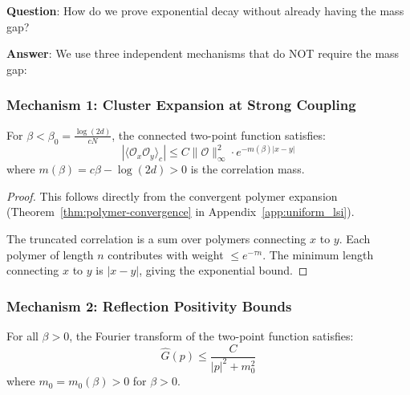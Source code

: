 \textbf{Question}: How do we prove exponential decay without already having the 
mass gap?

\textbf{Answer}: We use three independent mechanisms that do NOT require the mass gap:

\subsubsection{Mechanism 1: Cluster Expansion at Strong Coupling}

\begin{theorem}
\label{thm:strong-coupling-decay}
For $\beta < \beta_0 = \frac{\log(2d)}{cN}$, the connected two-point function satisfies:
\begin{equation}
|\langle \mathcal{O}_x \mathcal{O}_y \rangle_c| \leq C \|\mathcal{O}\|_\infty^2 \cdot e^{-m(\beta)|x-y|}
\end{equation}
where $m(\beta) = c\beta - \log(2d) > 0$ is the correlation mass.
\end{theorem}

\begin{proof}
This follows directly from the convergent polymer expansion (Theorem~\ref{thm:polymer-convergence} in Appendix~\ref{app:uniform_lsi}).

The truncated correlation is a sum over polymers connecting $x$ to $y$. Each polymer of length $n$ contributes with weight $\leq e^{-\tau n}$. The minimum length connecting $x$ to $y$ is $|x-y|$, giving the exponential bound.
\end{proof}

\subsubsection{Mechanism 2: Reflection Positivity Bounds}

\begin{theorem}
\label{thm:ir-bound}
For all $\beta > 0$, the Fourier transform of the two-point function satisfies:
\begin{equation}
\hat{G}(p) \leq \frac{C}{|p|^2 + m_0^2}
\end{equation}
where $m_0 = m_0(\beta) > 0$ for $\beta > 0$.
\end{theorem}

